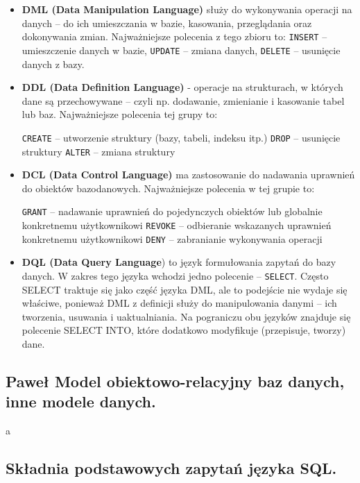 \documentclass[a4paper,12pt,oneside]{book}
\begin{document}
			\begin{itemize}
			\item \textbf{DML (Data Manipulation Language)} służy do wykonywania operacji na danych – do ich umieszczania w bazie, kasowania, przeglądania oraz dokonywania zmian. Najważniejsze polecenia z tego zbioru to:
			\subitem \verb*|INSERT| – umieszczenie danych w bazie,
			\subitem \verb*|UPDATE| – zmiana danych,
			\subitem \verb*|DELETE| – usunięcie danych z bazy.
			
			\item \textbf{DDL (Data Definition Language)} - operacje na strukturach, w których dane są przechowywane – czyli np. dodawanie, zmienianie i kasowanie tabel lub baz. Najważniejsze polecenia tej grupy to:
			
			\subitem \verb*|CREATE| – utworzenie struktury (bazy, tabeli, indeksu itp.)
			\subitem \verb*|DROP| – usunięcie struktury
			\subitem \verb*|ALTER| – zmiana struktury

			\item \textbf{DCL (Data Control Language)} ma zastosowanie do nadawania uprawnień do obiektów bazodanowych. Najważniejsze polecenia w tej grupie to:
			
			\subitem \verb*|GRANT| – nadawanie uprawnień do pojedynczych obiektów lub globalnie konkretnemu użytkownikowi
			\subitem \verb*|REVOKE| – odbieranie wskazanych uprawnień konkretnemu użytkownikowi
			\subitem \verb*|DENY| – zabranianie wykonywania operacji

			\item \textbf{DQL (Data Query Language}) to język formułowania zapytań do bazy danych. W zakres tego języka wchodzi jedno polecenie – \verb*|SELECT|. Często SELECT traktuje się jako część języka DML, ale to podejście nie wydaje się właściwe, ponieważ DML z definicji służy do manipulowania danymi – ich tworzenia, usuwania i uaktualniania. Na pograniczu obu języków znajduje się polecenie SELECT INTO, które dodatkowo modyfikuje (przepisuje, tworzy) dane.
			\end{itemize}
				
				
			\newpage\subsection{\color{green} Paweł \color{red}Model obiektowo-relacyjny baz danych, inne modele danych.}
				a
			\newpage\subsection{Składnia podstawowych zapytań języka SQL.}
\end{document}
